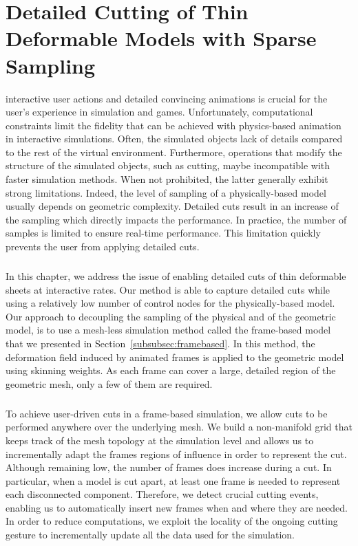 \chapter[Detailed Cutting with Sparse Sampling]{Detailed Cutting of Thin Deformable Models with Sparse Sampling}
\label{chap:cutting}
 interactive user actions and detailed convincing animations is crucial for the user's experience in simulation and games. Unfortunately, computational constraints limit the 
fidelity that can be achieved with physics-based animation
in interactive simulations. Often, the simulated objects lack of details compared to the rest of the virtual environment.
Furthermore, operations that modify the structure of the simulated objects, such as cutting, 
maybe incompatible with faster simulation methods.
When not prohibited, the latter generally exhibit strong limitations. Indeed, the level of sampling of a physically-based model usually depends on geometric complexity. Detailed cuts result in an increase of the sampling which directly impacts the performance. In practice, the number of samples is limited to ensure real-time performance. This limitation quickly prevents the user from applying detailed cuts.  
\paragraph*{}
In this chapter, we address the issue of enabling detailed cuts of thin deformable sheets at interactive rates.
 Our method is able to capture detailed cuts while using a relatively low number of control nodes for the physically-based model.
Our approach to decoupling the sampling of the physical and of the geometric model, is to use a mesh-less simulation method called the frame-based model~\cite{Gilles2011} that we presented in Section~\ref{subsubsec:framebased}. In this method, the deformation field induced by animated frames is applied to the geometric model using skinning weights. As each frame can cover a large, detailed region of the geometric mesh, only a few of them are required.
\paragraph*{}
To achieve user-driven cuts in a frame-based simulation, we allow cuts to be performed anywhere over the underlying mesh.
We build a non-manifold grid that keeps track of the mesh topology at the simulation level and allows us to incrementally adapt the frames regions of influence in order to  represent the cut.
Although remaining low, the number of frames does increase during a cut. 
In particular, when a model is cut apart, at least one frame is needed to represent each disconnected component. 
Therefore, we detect crucial cutting events, enabling us to automatically insert new frames when and where they are needed.
In order to reduce computations, we exploit the locality of the ongoing cutting gesture to incrementally update all the data used for the simulation.
